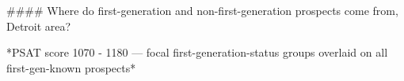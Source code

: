 #### Where do first-generation and non-first-generation prospects come from, Detroit area?

*PSAT score 1070 - 1180 — focal first-generation-status groups overlaid on all first-gen-known prospects*
